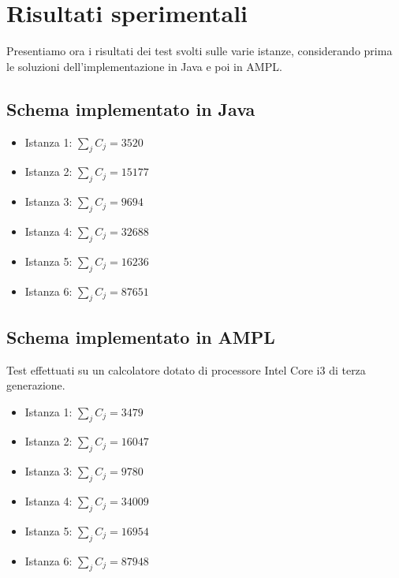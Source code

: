 \documentclass[a4paper]{article}
\begin{document}

\section{Risultati sperimentali}
Presentiamo ora i risultati dei test svolti sulle varie istanze, considerando prima le soluzioni dell'implementazione in Java e poi in AMPL.
\subsection{Schema implementato in Java}
\begin{itemize}
	\item Istanza 1: $\sum_{j} C_j = 3520$%
	\item Istanza 2: $\sum_{j} C_j = 15177$%
	\item Istanza 3: $\sum_{j} C_j = 9694$%
	\item Istanza 4: $\sum_{j} C_j = 32688$%
	\item Istanza 5: $\sum_{j} C_j = 16236$%
	\item Istanza 6: $\sum_{j} C_j = 87651$%
\end{itemize}
\subsection{Schema implementato in AMPL}
Test effettuati su un calcolatore dotato di processore Intel Core i3 di terza generazione.
\begin{itemize}
	\item Istanza 1: $\sum_{j} C_j = 3479$
	\item Istanza 2: $\sum_{j} C_j = 16047$
	\item Istanza 3: $\sum_{j} C_j = 9780$
	\item Istanza 4: $\sum_{j} C_j = 34009$
	\item Istanza 5: $\sum_{j} C_j = 16954$
	\item Istanza 6: $\sum_{j} C_j = 87948$
\end{itemize}
\end{document}
